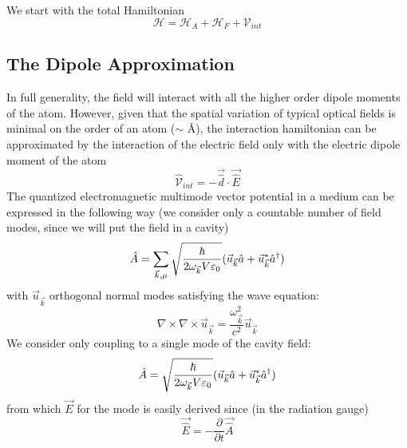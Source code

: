 We start with the total Hamiltonian
\begin{equation}
	\mathscr{H} = \mathscr{H}_A + \mathscr{H}_F +\mathscr{V}_{int}
\end{equation}
\subsection{The Dipole Approximation}
In full generality, the field will interact with all the higher order dipole moments of the atom.
However, given that the spatial variation of typical optical fields is minimal on the order of an atom ($\sim$ \AA), the interaction hamiltonian can be approximated by the interaction of the electric field only with the electric dipole moment of the atom
\begin{equation}
	\hat{\mathscr{V}}_{int} = -\vec{\hat{d}} \cdot \vec{\hat{E}}
\end{equation}
The quantized electromagnetic multimode vector potential in a medium can be expressed in the following way \cite[271--273]{Novotny2006}(we consider only a countable number of field modes, since we will put the field in a cavity)
\begin{equation}
	\hat{A} = \sum_{\vec{k}, \mu} \sqrt{\frac{\hbar}{2\omega_{\vec{k}} V \varepsilon_0}} (\vec{u}_{\vec{k}} \hat{a} + \vec{u}^*_{\vec{k}} \hat{a}^\dagger )
\end{equation}
with $\vec{u}_{\vec{k}}$ orthogonal normal modes satisfying the wave equation:
\begin{equation}
	\nabla \times \nabla \times \vec{u}_{\vec{k}} = \frac{\omega_{\vec{k}}^2}{c^2}  \vec{u}_{\vec{k}}
\end{equation}
We consider only coupling to a single mode of the cavity field:
\begin{equation}
	\hat{A} =  \sqrt{\frac{\hbar}{2\omega_{\vec{k}} V \varepsilon_0}} (\vec{u}_{\vec{k}} \hat{a} + \vec{u}^*_{\vec{k}} \hat{a}^\dagger )
\end{equation}
from which $\vec{E}$ for the mode is easily derived since (in the radiation gauge)
\begin{equation}
	\vec{\hat{E}} = -\frac{\partial}{\partial t}\vec{\hat{A}}
\end{equation}
